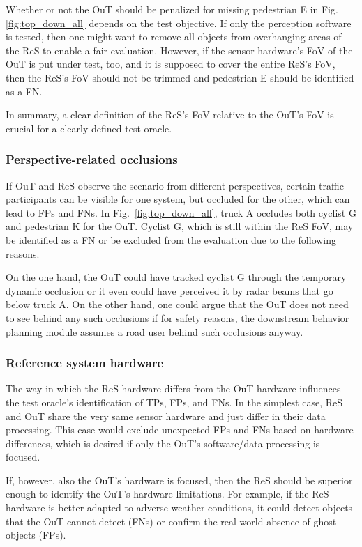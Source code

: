 \documentclass[conference]{IEEEtran}
\begin{document}
Whether or not the OuT should be penalized for missing pedestrian E in Fig. \ref{fig:top_down_all} depends on the test objective. 
If only the perception software is tested, then one might want to remove all objects from overhanging areas of the ReS to enable a fair evaluation.
However, if the sensor hardware's FoV of the OuT is put under test, too, and it is supposed to cover the entire ReS's FoV, then the ReS's FoV should not be trimmed and pedestrian E should be identified as a FN. 

In summary, a clear definition of the ReS's FoV relative to the OuT's FoV is crucial for a clearly defined test oracle. 

\subsubsection{Perspective-related occlusions}
\label{sec:occlusions}

If OuT and ReS observe the scenario from different perspectives, certain traffic participants can be visible for one system, but occluded for the other, which can lead to FPs and FNs. 
In Fig.~\ref{fig:top_down_all}, truck A occludes both cyclist G and pedestrian K for the OuT. 
Cyclist G, which is still within the ReS FoV, may be identified as a FN or be excluded from the evaluation due to the following reasons. 

On the one hand, the OuT could have tracked cyclist G through the temporary dynamic occlusion or it even could have perceived it by radar beams that go below truck A. 
On the other hand, one could argue that the OuT does not need to see behind any such occlusions if for safety reasons, the downstream behavior planning module assumes a road user behind such occlusions anyway.




\subsubsection{Reference system hardware}
\label{sec:ref_hw}

The way in which the ReS hardware differs from the OuT hardware influences the test oracle's identification of TPs, FPs, and FNs. 
In the simplest case, ReS and OuT share the very same sensor hardware and just differ in their data processing. 
This case would exclude unexpected FPs and FNs based on hardware differences, which is desired if only the OuT's software/data processing is focused. 

If, however, also the OuT's hardware is focused, then the ReS should be superior enough to identify the OuT's hardware limitations. 
For example, if the ReS hardware is better adapted to adverse weather conditions, it could detect objects that the OuT cannot detect (FNs) or confirm the real-world absence of ghost objects (FPs). 
\end{document}
